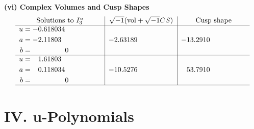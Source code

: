 \documentclass[1p]{elsarticle_modified}
\theoremstyle{definition}
\newcommand{\I}{\sqrt{-1}}
\begin{document}
\newpage\flushleft \textbf{(vi) Complex Volumes and Cusp Shapes}
$$\begin{array}{c|c|c}  
\text{Solutions to }I^u_{3}& \I (\text{vol} + \sqrt{-1}CS) & \text{Cusp shape}\\
 \hline 
\begin{aligned}
u &= -0.618034\phantom{ +0.000000I} \\
a &= -2.11803\phantom{ +0.000000I} \\
b &= \phantom{-0.000000 } 0\end{aligned}
 & -2.63189\phantom{ +0.000000I} & -13.2910\phantom{ +0.000000I} \\ \hline\begin{aligned}
u &= \phantom{-}1.61803\phantom{ +0.000000I} \\
a &= \phantom{-}0.118034\phantom{ +0.000000I} \\
b &= \phantom{-0.000000 } 0\end{aligned}
 & -10.5276\phantom{ +0.000000I} & \phantom{-}53.7910\phantom{ +0.000000I}\\
 \hline 
 \end{array}$$\newpage
\newpage\renewcommand{\arraystretch}{1}
\centering \section*{ IV. u-Polynomials}
\end{document}
